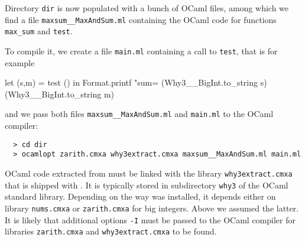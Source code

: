 Directory \texttt{dir} is now populated with a bunch of OCaml files,
among which we find a file \texttt{maxsum\_\_MaxAndSum.ml} containing
the OCaml code for functions \texttt{max\_sum} and \texttt{test}.

To compile it, we create a file \texttt{main.ml}
containing a call to \texttt{test}, that is for example
\begin{whycode}
  let (s,m) = test () in
  Format.printf "sum=%
    (Why3__BigInt.to_string s) (Why3__BigInt.to_string m)
\end{whycode}
and we pass both files \texttt{maxsum\_\_MaxAndSum.ml} and
\texttt{main.ml} to the OCaml compiler:
\begin{verbatim}
  > cd dir
  > ocamlopt zarith.cmxa why3extract.cmxa maxsum__MaxAndSum.ml main.ml
\end{verbatim}
OCaml code extracted from \why must be linked with the library
\texttt{why3extract.cmxa} that is shipped with \why. It is typically
stored in subdirectory \texttt{why3} of the OCaml standard library.
Depending on the way \why was installed, it depends either on library
\texttt{nums.cmxa} or \texttt{zarith.cmxa} for big integers. Above we
assumed the latter. It is likely that additional options \texttt{-I}
must be passed to the OCaml compiler for libraries
\texttt{zarith.cmxa} and \texttt{why3extract.cmxa} to be found.


